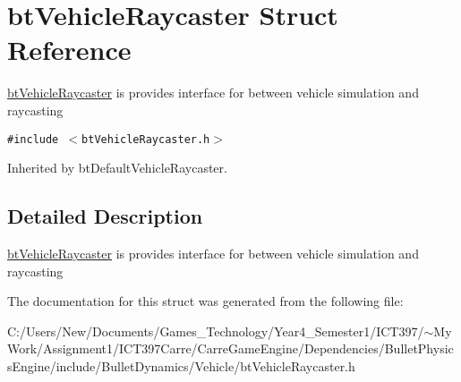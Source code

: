 \hypertarget{structbt_vehicle_raycaster}{
\section{btVehicleRaycaster Struct Reference}
\label{structbt_vehicle_raycaster}
}
\hyperlink{structbt_vehicle_raycaster}{btVehicleRaycaster} is provides interface for between vehicle simulation and raycasting  


{\tt \#include $<$btVehicleRaycaster.h$>$}

Inherited by btDefaultVehicleRaycaster.



\subsection{Detailed Description}
\hyperlink{structbt_vehicle_raycaster}{btVehicleRaycaster} is provides interface for between vehicle simulation and raycasting 

The documentation for this struct was generated from the following file:\begin{CompactItemize}
\item 
C:/Users/New/Documents/Games\_\-Technology/Year4\_\-Semester1/ICT397/$\sim$My Work/Assignment1/ICT397Carre/CarreGameEngine/Dependencies/BulletPhysicsEngine/include/BulletDynamics/Vehicle/btVehicleRaycaster.h\end{CompactItemize}
